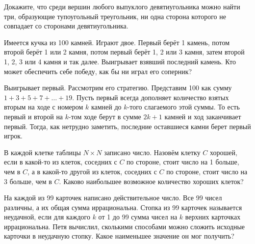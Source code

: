 \documentclass[11pt, a4paper]{template}
\begin{document}
\begin{exercise}
Докажите, что среди вершин любого выпуклого девятиугольника можно найти три, образующие
тупоугольный треугольник, ни одна сторона которого не совпадает со сторонами девятиугольника.
\end{exercise}

\begin{exercise}
Имеется кучка из 100 камней. Играют двое. Первый берёт 1 камень, потом второй берёт 1 или
2 камня, потом первый берёт 1, 2 или 3 камня, затем второй 1, 2, 3 или 4 камня и так далее.
Выигрывает взявший последний камень. Кто может обеспечить себе победу, как бы ни играл его
соперник?
\end{exercise}

\begin{solution}
Выигрывает первый. Рассмотрим его стратегию. Представим 100 как сумму $1 + 3 + 5 + 7 + \dots + 19$. Пусть первый всегда дополняет количество взятых вторым на ходе с номером $k$ камней до $k$-того слагаемого этой суммы. То есть первый и второй на $k$-том ходе берут в сумме $2k + 1$ камней и ход заканчивает первый. Тогда, как нетрудно заметить, последние оставшиеся камни берет первый игрок.
\end{solution}

\begin{exercise}
В каждой клетке таблицы $N \times N$ записано число. Назовём клетку $C$ хорошей, если в какой-то из клеток, соседних с $C$ по стороне, стоит число на 1 больше, чем в $C$, а в какой-то другой из клеток, соседних с $C$ по стороне, стоит число на 3 больше, чем в $C$. Каково наибольшее возможное количество хороших клеток?
\end{exercise}

\begin{exercise}
На каждой из 99 карточек написано действительное число. Все 99 чисел различны, а их общая сумма иррациональна. Стопка из 99 карточек называется неудачной, если для каждого $k$ от 1 до 99 сумма чисел на $k$ верхних карточках иррациональна. Петя вычислил, сколькими способами можно сложить исходные карточки в неудачную стопку. Какое наименьшее значение он мог получить?
\end{exercise}
\end{document}
